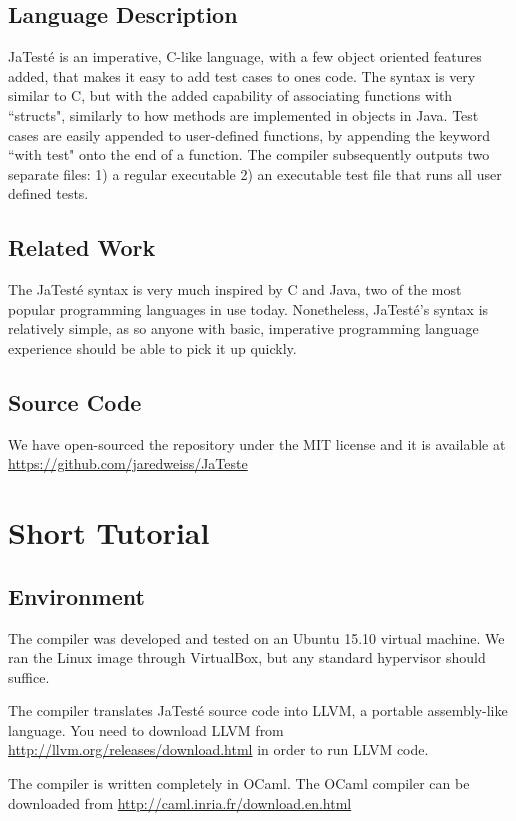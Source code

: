 \documentclass{article}
\begin{document}
\subsection {Language Description}
JaTest\'{e} is an imperative, C-like language, with a few object oriented features added, that makes it easy to add test cases to ones code. The syntax is very similar to C, but with the added capability of associating functions with ``structs", similarly to how methods are implemented in objects in Java. Test cases are easily appended to user-defined functions, by appending the keyword ``with test" onto the end of a function. The compiler subsequently outputs two separate files: 1) a regular executable 2) an executable test file that runs all user defined tests.

\subsection{Related Work}
The JaTest\'{e} syntax is very much inspired by C and Java, two of the most popular programming languages in use today. Nonetheless, JaTest\'{e}'s syntax is relatively simple, as so anyone with basic, imperative programming language experience should be able to pick it up quickly.

\subsection{Source Code}
We have open-sourced the repository under the MIT license and it is available at \url{https://github.com/jaredweiss/JaTeste}

\newpage

\section{Short Tutorial}
\subsection{Environment}
The compiler was developed and tested on an Ubuntu 15.10 virtual machine. We ran the Linux image through VirtualBox, but any standard hypervisor should suffice.
\par
The compiler translates JaTest\'{e} source code into LLVM, a portable assembly-like language. You need to download LLVM from \url{http://llvm.org/releases/download.html} in order to run LLVM code.
\par
The compiler is written completely in OCaml. The OCaml compiler can be downloaded from \url{http://caml.inria.fr/download.en.html}
\end{document}
